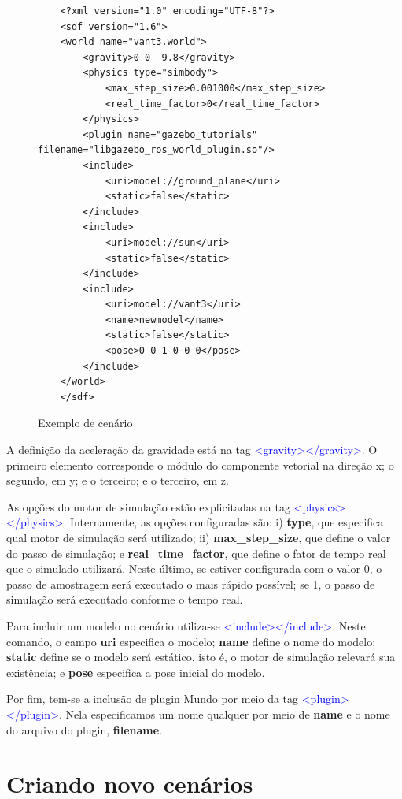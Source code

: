 \begin{figure}[ht!]
	\begin{verbatim}
	<?xml version="1.0" encoding="UTF-8"?>
	<sdf version="1.6">
	<world name="vant3.world">
		<gravity>0 0 -9.8</gravity>
		<physics type="simbody">
			<max_step_size>0.001000</max_step_size>
			<real_time_factor>0</real_time_factor>
		</physics>
		<plugin name="gazebo_tutorials" filename="libgazebo_ros_world_plugin.so"/>
		<include>
			<uri>model://ground_plane</uri>
			<static>false</static>
		</include>
		<include>
			<uri>model://sun</uri>
			<static>false</static>
		</include>
		<include>
			<uri>model://vant3</uri>
			<name>newmodel</name>
			<static>false</static>
			<pose>0 0 1 0 0 0</pose>
		</include>
	</world>
	</sdf>\end{verbatim}
	\caption{Exemplo de cenário}
	\label{empty.world}
\end{figure}


A definição da aceleração da gravidade está na tag \textcolor{blue}{<gravity></gravity>}. O primeiro elemento corresponde o módulo do componente vetorial na direção x; o segundo, em y; e o terceiro; e o terceiro, em z.

As opções do motor de simulação estão explicitadas na tag \textcolor{blue}{<physics></physics>}. Internamente, as opções configuradas são: i) \textbf{type}, que especifica qual motor de simulação será utilizado; ii) \textbf{max\_step\_size}, que define o valor do passo de simulação; e \textbf{real\_time\_factor}, que define o fator de tempo real que o simulado utilizará. Neste último, se estiver configurada com o valor 0, o passo de amostragem será executado o mais rápido possível; se 1, o passo de simulação será executado conforme o tempo real.

Para incluir um modelo no cenário utiliza-se \textcolor{blue}{<include></include>}. Neste comando, o campo \textbf{uri} especifica o modelo; \textbf{name} define o nome do modelo; \textbf{static} define se o modelo será estático, isto é, o motor de simulação relevará sua existência; e \textbf{pose} especifica a pose inicial do modelo.
	
Por fim, tem-se a inclusão de plugin Mundo por meio da tag \textcolor{blue}{<plugin></plugin>}. Nela especificamos um nome qualquer por meio de \textbf{name} e o nome do arquivo do plugin, \textbf{filename}. 


\section{Criando novo cenários}

